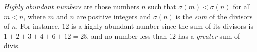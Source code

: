 {\sl Highly abundant numbers} are those numbers $n$ such that $\sigma(m) < \sigma(n)$ for all $m < n$, where $m$ and $n$ are positive integers and $\sigma(n)$ is the {\sl sum} of the divisors of $n$. For instance, $12$ is a highly abundant number since the sum of its divisors is $1 + 2 + 3 + 4 + 6 + 12 = 28$, and no number less than $12$ has a {\sl greater} sum of divis.

\bye